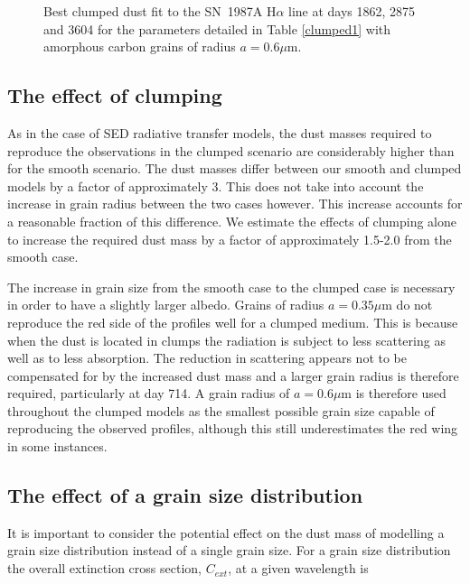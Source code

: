 \documentclass[useAMS,usenatbib,usegraphicx]{mnras}
\begin{document}
\begin{figure}
\caption{Best clumped dust fit to the SN~1987A  H$\alpha$ line at days 1862, 2875 and 
3604 for the parameters detailed in Table \ref{clumped1} with amorphous carbon grains of radius $a=0.6\mu$m.}
\label{d1862_3604_c}

\end{figure}

\subsection{The effect of clumping}


As in the case of SED radiative transfer models, the dust masses required to reproduce the 
observations in the clumped scenario are considerably higher than for the smooth scenario.  The dust masses differ between our smooth and clumped models by a factor of approximately 3.  This does not take into account the increase in grain radius between the two cases however.  This increase accounts for a reasonable fraction of this difference. We estimate the effects of clumping alone to increase the required dust mass by a factor of approximately 1.5-2.0 from the smooth case.

The increase in grain size from the smooth case to the clumped case is necessary in order to have a slightly larger albedo.  Grains of radius $a=0.35 \mu$m do not reproduce the red side of the profiles well for a clumped medium.  This is because when 
the dust is located in clumps the radiation is subject to less scattering 
as well as to less absorption.  The reduction in scattering appears not to be 
compensated for by the increased dust mass and a larger grain radius is 
therefore required, particularly at day 714.  A grain radius of $a=0.6\mu$m 
is therefore used throughout the clumped models as the smallest possible 
grain size capable of reproducing the observed profiles, although this still underestimates the red wing in some instances. 




\subsection{The effect of a grain size distribution}
\label{gs_distn}
It is important to consider the potential effect on the dust mass of modelling a grain size distribution instead of a single grain size.  For a grain size distribution the overall extinction cross section, $C_{ext}$, at a given wavelength is 
\end{document}
